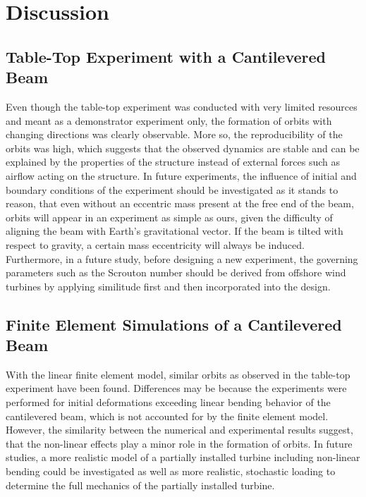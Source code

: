 \documentclass{article}
\begin{document}
\clearpage

\section{Discussion}
\label{sec:discussion}

\subsection{Table-Top Experiment with a Cantilevered Beam}

Even though the table-top experiment was conducted with very limited resources and meant as a demonstrator experiment only, the formation of orbits with changing directions was clearly observable. More so, the reproducibility of the orbits was high, which suggests that the observed dynamics are stable and can be explained by the properties of the structure instead of external forces such as airflow acting on the structure. In future experiments, the influence of initial and boundary conditions of the experiment should be investigated as it stands to reason, that even without an eccentric mass present at the free end of the beam, orbits will appear in an experiment as simple as ours, given the difficulty of aligning the beam with Earth's gravitational vector. If the beam is tilted with respect to gravity, a certain mass eccentricity will always be induced. Furthermore, in a future study, before designing a new experiment, the governing parameters such as the Scrouton number should be derived from offshore wind turbines by applying similitude first and then incorporated into the design. 

\subsection{Finite Element Simulations of a Cantilevered Beam}

With the linear finite element model, similar orbits as observed in the table-top experiment have been found. Differences may be because the experiments were performed for initial deformations exceeding linear bending behavior of the cantilevered beam, which is not accounted for by the finite element model. However, the similarity between the numerical and experimental results suggest, that the non-linear effects play a minor role in the formation of orbits. In future studies, a more realistic model of a partially installed turbine including non-linear bending could be investigated as well as more realistic, stochastic loading to determine the full mechanics of the partially installed turbine.
\end{document}
